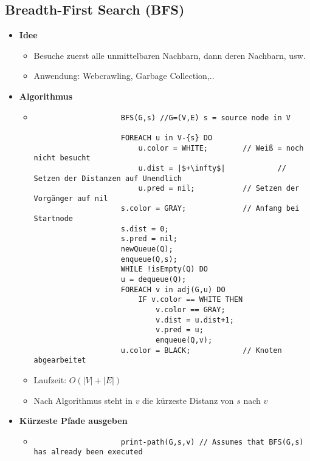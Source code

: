 \subsection{Breadth-First Search (BFS)}
    \begin{itemize}
        \item \textbf{Idee}
            \begin{itemize}
                \item Besuche zuerst alle unmittelbaren Nachbarn, dann deren Nachbarn, usw.
                \item Anwendung: Webcrawling, Garbage Collection,..
            \end{itemize}
        
        \item \textbf{Algorithmus}
            \begin{itemize}
                \item[]
                    \begin{verbatim}
                    BFS(G,s) //G=(V,E) s = source node in V

                    FOREACH u in V-{s} DO
                        u.color = WHITE;        // Weiß = noch nicht besucht
                        u.dist = |$+\infty$|            // Setzen der Distanzen auf Unendlich
                        u.pred = nil;           // Setzen der Vorgänger auf nil
                    s.color = GRAY;             // Anfang bei Startnode
                    s.dist = 0;
                    s.pred = nil;
                    newQueue(Q);
                    enqueue(Q,s);
                    WHILE !isEmpty(Q) DO
                    u = dequeue(Q); 
                    FOREACH v in adj(G,u) DO
                        IF v.color == WHITE THEN
                            v.color == GRAY;
                            v.dist = u.dist+1;
                            v.pred = u;
                            enqueue(Q,v);
                    u.color = BLACK;            // Knoten abgearbeitet
                    \end{verbatim}
                \item Laufzeit: $O(|V| + |E|)$
                \item Nach Algorithmus steht in $v$ die kürzeste Distanz von $s$ nach $v$
            \end{itemize}

        \item \textbf{Kürzeste Pfade ausgeben}
            \begin{itemize}
                \item[]
                    \begin{verbatim}
                    print-path(G,s,v) // Assumes that BFS(G,s) has already been executed


\end{verbatim}
\end{itemize}
\end{itemize}
